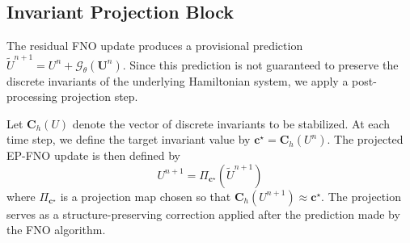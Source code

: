 \documentclass[11pt,a4paper]{article}
\theoremstyle{definition}
\theoremstyle{remark}
\numberwithin{equation}{section}
\numberwithin{figure}{section}
\numberwithin{table}{section}
\begin{document}
\subsection{Invariant Projection Block}
\label{subsec:invariant_projection_block}

The residual FNO update produces a provisional prediction
\(\widetilde U^{n+1}=U^n+\mathcal G_\theta(\mathbf U^n)\). Since this prediction is not guaranteed to preserve the discrete
invariants of the underlying Hamiltonian system, we apply a post-processing
projection step.

Let \(\mathbf C_h(U)\) denote the
vector of discrete invariants to be stabilized. At each time step, we define the target invariant value by
\(\mathbf c^\star=\mathbf C_h(U^n)\). The projected EP-FNO update is then
defined by 
\[
    U^{n+1}=\Pi_{\mathbf c^\star}(\widetilde U^{n+1}) %
\]
where \(\Pi_{\mathbf c^\star}\) is a projection map chosen so that \(\mathbf C_h(U^{n+1})\approx \mathbf c^\star\). The projection serves as a structure-preserving correction applied after the prediction made by the FNO algorithm. 

\end{document}
